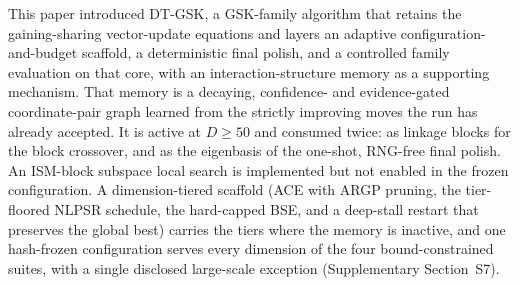 \documentclass[10pt,a4paper]{article}
\newcommand{\dtgsk}{DT-GSK}
\begin{document}
This paper introduced \dtgsk{}, a GSK-family algorithm that retains the
gaining-sharing vector-update equations and layers an adaptive configuration-and-budget
scaffold, a deterministic final polish, and a controlled family evaluation on that
core, with an interaction-structure memory as a supporting mechanism. 
That memory is a decaying, confidence- and evidence-gated
coordinate-pair graph learned from the strictly improving moves the run
has already accepted. It is active at $D \geq 50$ and consumed
twice: as linkage blocks for the block crossover, and as the eigenbasis of
the one-shot, RNG-free final polish. An ISM-block subspace local search is
implemented but not enabled in the frozen configuration. 
A dimension-tiered scaffold (ACE with ARGP pruning, the tier-floored
NLPSR schedule, the hard-capped BSE, and a deep-stall restart that
preserves the global best) carries the tiers where the memory is
inactive, and one hash-frozen configuration serves every dimension of
the four bound-constrained suites, with a single disclosed large-scale
exception
(Supplementary Section~S7). 
\end{document}

